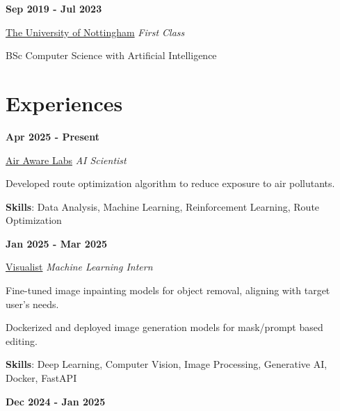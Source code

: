 \documentclass[9pt,a4paper]{article} %
\newenvironment{itemize-noindent}
{
\setlength{\leftmargini}{1em}
\begin{itemize}
\setlength{\itemsep}{0pt}
\setlength{\parskip}{0pt}
}
{\end{itemize}}
\begin{document}
\begin{multicols}{2}

\textbf{Sep 2019 - Jul 2023}

\href{https://www.nottingham.ac.uk}{The University of Nottingham} \hfill \textit{First Class}

BSc Computer Science with Artificial Intelligence


\section{Experiences}

\textbf{Apr 2025 - Present}

\href{https://www.airawarelabs.com}{Air Aware Labs} \hfill \textit{AI Scientist}

\begin{itemize-noindent}
    \item Developed route optimization algorithm to reduce exposure to air pollutants.
    \item \textbf{Skills}: Data Analysis, Machine Learning, Reinforcement Learning, Route Optimization
\end{itemize-noindent}
\vspace{2mm}


\textbf{Jan 2025 - Mar 2025}

\href{https://visualistapp.com/}{Visualist} \hfill \textit{Machine Learning Intern}

\begin{itemize-noindent}
    \item Fine-tuned image inpainting models for object removal, aligning with target user's needs.
    \item Dockerized and deployed image generation models for mask/prompt based editing.
    \item \textbf{Skills}: Deep Learning, Computer Vision, Image Processing, Generative AI, Docker, FastAPI
\end{itemize-noindent}
\vspace{2mm}


\textbf{Dec 2024 - Jan 2025}


\end{multicols}
\end{document}
